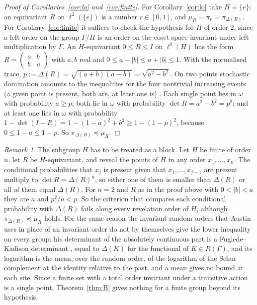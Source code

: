 \documentclass[11pt]{amsart}
\theoremstyle{remark}
\newtheorem{remark}[proposition]{Remark}
\theoremstyle{definition}
\newcommand{\Ga}{\Gamma}
\newcommand{\FK}{\Delta}
\newcommand{\dom}{\preccurlyeq}
\newcommand{\ltwo}{\ell^2}
\begin{document}
\begin{proof}[Proof of Corollaries~\ref{cor:lo} and~\ref{cor:finite}]
For Corollary~\ref{cor:lo} take $H=\{e\}$: an equivariant $R$ on $\ltwo(\{e\})$ is a number $r\in[0,1]$, and
$\mu_R=\pi_r=\pi_{\FK(R)}$. For Corollary~\ref{cor:finite} it suffices to check the hypothesis for $H$ of order $2$,
since a left order on the group $\Ga/H$ is an order on the coset space invariant under left multiplication by $\Ga$.
An $H$-equivariant $0\le R\le I$ on $\ltwo(H)$ has the form $R=\begin{pmatrix}a&b\\b&a\end{pmatrix}$ with $a,b$ real and
$0\le a-|b|\le a+|b|\le1$. With the normalised trace, $p:=\FK(R)=\sqrt{(a+b)(a-b)}=\sqrt{a^2-b^2}$. On two points
stochastic domination amounts to the inequalities for the four nontrivial increasing events (a given point is present,
both are, at least one is) \cite{Str65}. Each single point lies
in $\omega$ with probability $a\ge p$; both lie in $\omega$ with probability $\det R=a^2-b^2=p^2$; and at least one lies
in $\omega$ with probability $1-\det(I-R)=1-(1-a)^2+b^2\ge1-(1-p)^2$, because $0\le1-a\le1-p$. So
$\pi_{\FK(R)}\dom\mu_R$.
\end{proof}

\begin{remark}\label{rem:block}
The subgroup $H$ has to be treated as a block. Let $H$ be finite of order $n$, let $R$ be $H$-equivariant, and reveal
the points of $H$ in any order $x_1,\dots,x_n$. The conditional probabilities that $x_j$ is present given that
$x_1,\dots,x_{j-1}$ are present multiply to $\det R=\FK(R)^n$, so either one of them is smaller than $\FK(R)$ or all of
them equal $\FK(R)$. For $n=2$ and $R$ as in the proof above with $0<|b|<a$ they are $a$ and $p^2/a<p$. So the criterion that
compares each conditional probability with $\FK(R)$ fails along every revelation order of $H$, although
$\pi_{\FK(R)}\dom\mu_R$ holds. For the same reason the invariant random
orders that Austin uses in place of an invariant order \cite[Thm.~B]{Aus} do not by themselves give the lower
inequality on every group: his determinant of the absolutely continuous part is a Fuglede--Kadison determinant
\cite[Prop.~2.8, Def.~2.11]{Aus}, equal to $\FK(K)$ for the functional of $K\in R(\Ga)$, and its logarithm is the mean, over the random order, of the logarithm
of the Schur complement at the identity relative to the past, and a mean gives no bound at each site. Since a finite set
with a total order invariant under a transitive action is a single point, Theorem~\ref{thm:B} gives nothing for a finite
group beyond its hypothesis.
\end{remark}
\end{document}
